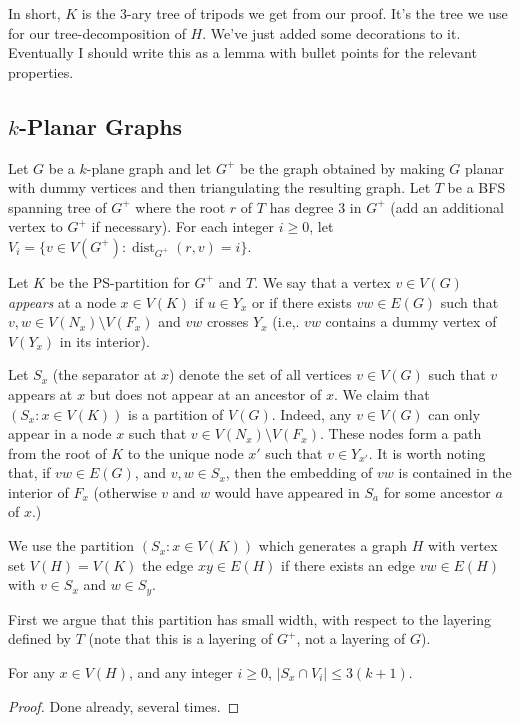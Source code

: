 \documentclass{patmorin}
\DeclareMathOperator{\dist}{dist}
\begin{document}
In short, $K$ is the 3-ary tree of tripods we get from our proof.  It's the tree we use for our tree-decomposition of $H$.  We've just added some decorations to it. Eventually I should write this as a lemma with bullet points for the relevant properties.

\subsection{$k$-Planar Graphs}

Let $G$ be a $k$-plane graph and let $G^+$ be the graph obtained by making $G$ planar with dummy vertices and then triangulating the resulting graph. Let $T$ be a BFS spanning tree of $G^+$ where the root $r$ of $T$ has degree 3 in $G^+$ (add an additional vertex to $G^+$ if necessary). For each integer $i\ge 0$, let $V_i=\{v\in V(G^+): \dist_{G^+}(r,v)=i\}$.

Let $K$ be the PS-partition for $G^+$ and $T$.  We say that a vertex $v\in V(G)$ \emph{appears} at a node $x\in V(K)$ if $u\in Y_x$ or if there exists $vw\in E(G)$ such that $v,w\in V(N_x)\setminus V(F_x)$ and $vw$ crosses $Y_x$ (i.e,. $vw$ contains a dummy vertex of $V(Y_x)$ in its interior).

Let $S_x$ (the separator at $x$) denote the set of all vertices $v\in V(G)$ such that $v$ appears at $x$ but does not appear at an ancestor of $x$.  We claim that $(S_x:x\in V(K))$ is a partition of $V(G)$.  Indeed, any $v\in V(G)$ can only appear in a node $x$ such that $v\in V(N_x)\setminus V(F_x)$.  These nodes form a path from the root of $K$ to the unique node $x'$ such that $v\in Y_{x'}$.  It is worth noting that, if $vw\in E(G)$, and $v,w\in S_x$, then the embedding of $vw$ is contained in the interior of $F_x$ (otherwise $v$ and $w$ would have appeared in $S_a$ for some ancestor $a$ of $x$.)

We use the partition $(S_x: x\in V(K))$ which generates a graph $H$ with vertex set $V(H)=V(K)$ the edge $xy\in E(H)$ if there exists an edge $vw\in E(H)$ with $v\in S_x$ and $w\in S_y$.

First we argue that this partition has small width, with respect to the layering defined by $T$ (note that this is a layering of $G^+$, not a layering of $G$).

\begin{clm}
  For any $x\in V(H)$, and any integer $i\ge 0$, $|S_x\cap V_i|\le 3(k+1)$.
\end{clm}

\begin{proof}
  Done already, several times.
\end{proof}
\end{document}
